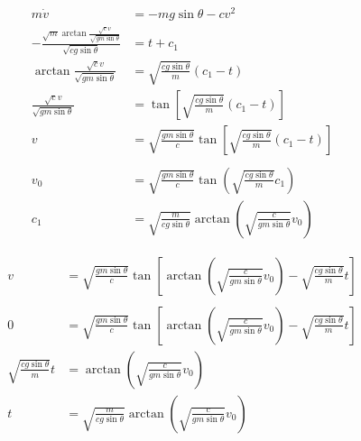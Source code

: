 \documentclass{article}
\begin{document}
\begin{align*}
  m \dot{v}                                                                                  & = -m g \sin \theta - c v^2                                                                        \\
  -\frac{\sqrt{m} \arctan \frac{\sqrt{c} v}{\sqrt{g m \sin \theta}}}{\sqrt{c g \sin \theta}} & = t + c_1                                                                                         \\
  \arctan \frac{\sqrt{c} v}{\sqrt{g m \sin \theta}}                                          & = \sqrt{\frac{c g \sin \theta}{m}} (c_1 - t)                                                      \\
  \frac{\sqrt{c} v}{\sqrt{g m \sin \theta}}                                                  & = \tan \left[ \sqrt{\frac{c g \sin \theta}{m}} (c_1 - t) \right]                                  \\
  v                                                                                          & = \sqrt{\frac{g m \sin \theta}{c}} \tan \left[ \sqrt{\frac{c g \sin \theta}{m}} (c_1 - t) \right] \\ \\
  v_0                                                                                        & = \sqrt{\frac{g m \sin \theta}{c}} \tan \left( \sqrt{\frac{c g \sin \theta}{m}} c_1 \right)       \\
  c_1                                                                                        & = \sqrt{\frac{m}{c g \sin \theta}} \arctan \left( \sqrt{\frac{c}{g m \sin \theta}} v_0 \right)
\end{align*}

\begin{align*}
  v                                  & = \sqrt{\frac{g m \sin \theta}{c}} \tan \left[ \arctan \left( \sqrt{\frac{c}{g m \sin \theta}} v_0 \right) - \sqrt{\frac{c g \sin \theta}{m}} t \right] \\ \\
  0                                  & = \sqrt{\frac{g m \sin \theta}{c}} \tan \left[ \arctan \left( \sqrt{\frac{c}{g m \sin \theta}} v_0 \right) - \sqrt{\frac{c g \sin \theta}{m}} t \right] \\
  \sqrt{\frac{c g \sin \theta}{m}} t & = \arctan \left( \sqrt{\frac{c}{g m \sin \theta}} v_0 \right)                                                                                           \\
  t                                  & = \sqrt{\frac{m}{c g \sin \theta}} \arctan \left( \sqrt{\frac{c}{g m \sin \theta}} v_0 \right)
\end{align*}
\end{document}
